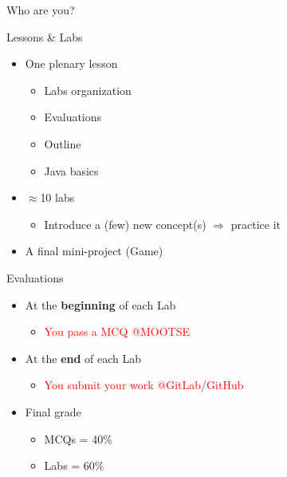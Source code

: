 \documentclass[English,t,%
hyperref={%
    pdftitle={FISA-DE2 OOP in Java},%
    pdfauthor={Guillaume Muller},%
    pdfsubject={OOP in Java},%
    pdfkeywords={OOP, Java}%
    },%
xcolor={pdftex,svgnames} %
]{beamer}
\begin{document}
\begin{frame}{Who are you?}

\end{frame}

\begin{frame}{Lessons \& Labs}

  \begin{itemize}
%
    \item One plenary lesson
    \vspace{.5em}
    \begin{itemize}
      \item Labs organization
      \item Evaluations
      \item Outline
      \item Java basics
    \end{itemize}
%
    \vspace{2em}
    \item $\approx$10 labs
    \vspace{.5em}
    \begin{itemize}
      \item Introduce a (few) new concept(s) $\Rightarrow$ practice it
    \end{itemize}
%
    \vspace{2em}
    \item A final mini-project (Game)
%
  \end{itemize}

\end{frame}


\begin{frame}{Evaluations}

  \begin{itemize}
    \item At the \textbf{beginning} of each Lab
    \begin{itemize}
      \item \textcolor{red}{You pass a MCQ @MOOTSE}
    \end{itemize}
%
    \vspace{2em}
    \item At the \textbf{end} of each Lab
    \begin{itemize}
      \item \textcolor{red}{You submit your work @GitLab/GitHub}
    \end{itemize}
%
    \vspace{2em}
    \item Final grade
    \begin{itemize}
      \item MCQs = 40\%
      \item Labs = 60\%
    \end{itemize}
%
  \end{itemize}

\end{frame}
\end{document}

